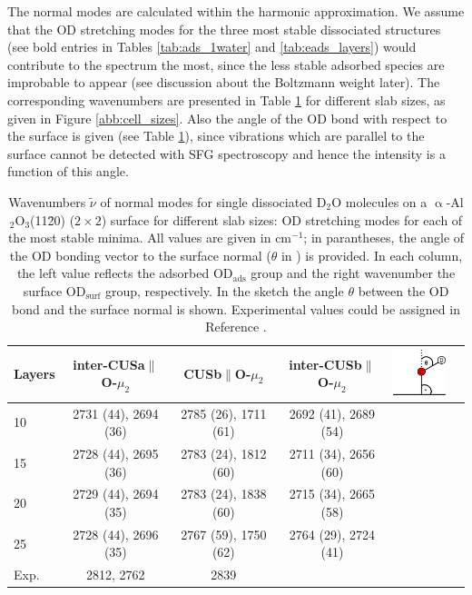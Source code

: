 \documentclass[11pt,DIV=13,BCOR=5mm,a4paper,headinclude]{scrbook}
\begin{document}
The normal modes are calculated within the harmonic approximation.
We assume that the OD stretching modes for the three most stable dissociated structures (see bold entries in Tables \ref{tab:ads_1water} and \ref{tab:eads_layers}) would contribute to the spectrum the most, since the less stable adsorbed species are improbable to appear (see discussion about the Boltzmann weight later).
The corresponding wavenumbers are presented in Table \ref{tab:freq_layers} for different slab sizes, as given in Figure \ref{abb:cell_sizes}.
Also the angle of the OD bond with respect to the surface is given (see Table \ref{tab:freq_layers}), since vibrations which are parallel to the surface cannot be detected with SFG spectroscopy and hence the intensity is a function of this angle.
\begin{table}[th]
  \centering
 \caption{Wavenumbers $\tilde{\nu}$ of normal modes for single dissociated D$_2$O molecules on a $\upalpha$-Al$_2$O$_3$(11\=20) ($2\times 2$) surface for different slab sizes: OD stretching modes for each of the most stable minima.
All values are given in cm$^{-1}$; in parantheses, the angle of the OD bonding vector to the surface normal ($\theta$ in \textdegree) is provided.
In each column, the left value reflects the adsorbed OD$_\textrm{ads}$ group and the right wavenumber the surface OD$_\textrm{surf}$ group, respectively.
 In the sketch the angle $\theta$ between the OD bond and the surface normal is shown.
 Experimental values could be assigned in Reference \cite{Heiden11-20_2018}.}
\vspace*{.2cm} 
 \begin{tabular}{l|ccccc}
 \toprule
  Layers&inter-CUSa$\parallel$O-$\mu_2$ &CUSb$\parallel$O-$\mu_2$  &inter-CUSb$\parallel$O-$\mu_2$&\multirow{6}{1pt}{\includegraphics[width=2cm]{figures/11-20/ODangle.png}} \\\midrule
  10 &2731 (44), 2694 (36) &2785 (26), 1711 (61) &2692 (41), 2689 (54)& \\
  15 &2728 (44), 2695 (36) &2783 (24), 1812 (60) &2711 (34), 2656 (60)& \\
  20 &2729 (44), 2694 (35) &2783 (24), 1838 (60) &2715 (34), 2665 (58)& \\
  25 &2728 (44), 2696 (35) &2767 (59), 1750 (62) &2764 (29), 2724 (41)& \\\midrule
  Exp.\cite{Heiden11-20_2018} &2812, 2762& 2839 & \\\bottomrule
  \end{tabular} 
  \label{tab:freq_layers}
\end{table}
\\\\
\end{document}
